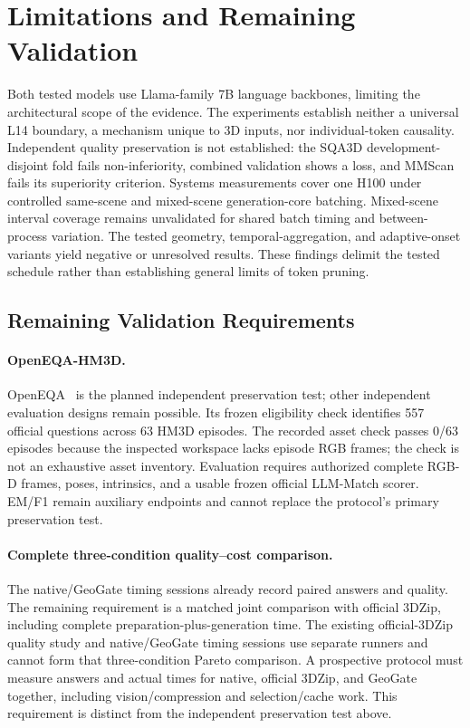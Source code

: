 \section{Limitations and Remaining Validation}
\label{sec:supp_limitations}

Both tested models use Llama-family 7B language backbones, limiting the architectural scope of the evidence. The experiments establish neither a universal L14 boundary, a mechanism unique to 3D inputs, nor individual-token causality. Independent quality preservation is not established: the SQA3D development-disjoint fold fails non-inferiority, combined validation shows a loss, and MMScan fails its superiority criterion. Systems measurements cover one H100 under controlled same-scene and mixed-scene generation-core batching. Mixed-scene interval coverage remains unvalidated for shared batch timing and between-process variation. The tested geometry, temporal-aggregation, and adaptive-onset variants yield negative or unresolved results. These findings delimit the tested schedule rather than establishing general limits of token pruning.

\subsection{Remaining Validation Requirements}
\label{sec:supp_pending}
\paragraph{OpenEQA-HM3D.} OpenEQA~\citep{majumdar2024openeqa} is the planned independent preservation test; other independent evaluation designs remain possible. Its frozen eligibility check identifies 557 official questions across 63 HM3D episodes. The recorded asset check passes 0/63 episodes because the inspected workspace lacks episode RGB frames; the check is not an exhaustive asset inventory. Evaluation requires authorized complete RGB-D frames, poses, intrinsics, and a usable frozen official LLM-Match scorer. EM/F1 remain auxiliary endpoints and cannot replace the protocol's primary preservation test.

\paragraph{Complete three-condition quality--cost comparison.} The native/GeoGate timing sessions already record paired answers and quality. The remaining requirement is a matched joint comparison with official 3DZip, including complete preparation-plus-generation time. The existing official-3DZip quality study and native/GeoGate timing sessions use separate runners and cannot form that three-condition Pareto comparison. A prospective protocol must measure answers and actual times for native, official 3DZip, and GeoGate together, including vision/compression and selection/cache work. This requirement is distinct from the independent preservation test above.
